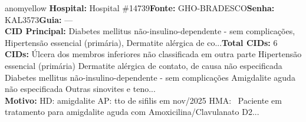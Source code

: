 \documentclass[a4paper,10pt]{article}
\begin{document}
\begin{anomalycard}[Interna\c{c}\~{a}o \#119986 | Pac. \#99482 | MODERADO (z=2.24) | LOS: 4d | 05/03/2026\,$\to$\,09/03/2026]{anomyellow}
\textbf{Hospital:} Hospital \#14739\quad \textbf{Fonte:} GHO-BRADESCO\quad \textbf{Senha:} KAL3573\quad \textbf{Guia:} ---\\

\textbf{CID Principal:} {\small Diabetes mellitus não-insulino-dependente - sem complicações, Hipertensão essencial (primária), Dermatite alérgica de co...}\quad\textbf{Total CIDs:} 6\\

\textbf{CIDs:} {\scriptsize Úlcera dos membros inferiores não classificada em outra parte \textbar{} Hipertensão essencial (primária) \textbar{} Dermatite alérgica de contato, de causa não especificada \textbar{} Diabetes mellitus não-insulino-dependente - sem complicações \textbar{} Amigdalite aguda não especificada \textbar{} Outras sinovites e teno...}\\

\textbf{Motivo:} {\scriptsize HD: amigdalite AP: tto de sifilis em nov/2025  HMA:  Paciente em tratamento para amigdalite aguda com Amoxicilina/Clavulanato D2...}\\




\end{anomalycard}
\end{document}
